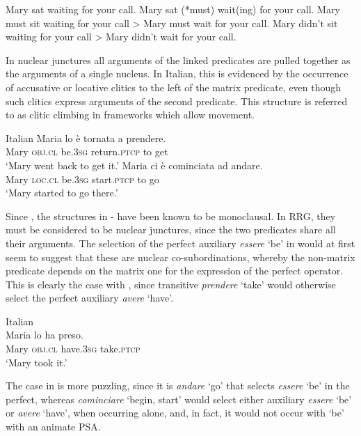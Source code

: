 \documentclass[output=paper,hidelinks]{langscibook}
\begin{document}
\ea%
   \label{ex:RRG:39}
   \ea\label{ex:RRG:39a} Mary sat waiting for your call.
   \ex\label{ex:RRG:39b} Mary sat (*must) wait(ing) for your call.
   \ex\label{ex:RRG:39c} Mary must sit waiting for your call > Mary must wait for your call.
   \ex\label{ex:RRG:39d} Mary didn't sit waiting for your call > Mary didn't wait for your call.
   \z\z

\noindent  In nuclear junctures all arguments of the linked predicates are pulled together as the arguments of a single nucleus. In Italian, this is evidenced by the occurrence of accusative or locative clitics to the left of the matrix predicate, even though such clitics express arguments of the second predicate. This structure is referred to as clitic climbing in frameworks which allow movement.

\ea%
   \label{ex:RRG:40} Italian
\ea\label{ex:RRG:40a}   \gll Maria  lo  è  tornata  a  prendere.\\
   Mary  \textsc{obj.cl}  be.3\textsc{sg}  return.\textsc{ptcp}  to  get \\
   \glt `Mary went back to get it.'
\ex\label{ex:RRG:40b}   \gll Maria  ci  è  cominciata  ad  andare. \\
      Mary  \textsc{loc.cl}  be.3\textsc{sg}  start.\textsc{ptcp}  to  go\\
   \glt `Mary started to go there.'
   \z\z

  Since \citet{Rizzi1976}, the structures in - have been known to be monoclausal. In RRG, they must be considered to be nuclear junctures, since the two predicates share all their arguments. The selection of the perfect auxiliary \textit{essere} `be' in  would at first seem to suggest that these are nuclear co-subordinations, whereby the non-matrix predicate depends on the matrix one for the expression of the perfect operator. This is clearly the case with , since transitive \textit{prendere} `take' would otherwise select the perfect auxiliary \textit{avere} `have'.

\ea%
   \label{ex:RRG:41} Italian\\
\gll Maria  lo  ha  preso.\\
  Mary   \textsc{obj.cl}  have.\textsc{3sg}  take.\textsc{ptcp}\\
   \glt `Mary took it.'
 \z

  The case in  is more puzzling, since it is \textit{andare} `go' that selects \textit{essere} `be' in the perfect, whereas \textit{cominciare} `begin, start' would select either auxiliary \textit{essere} `be' or \textit{avere} `have', when occurring alone, and, in fact, it would not occur with `be' with an animate PSA.
\end{document}

